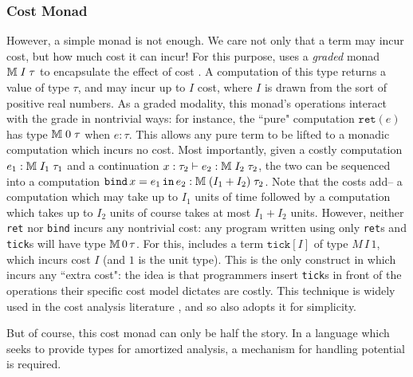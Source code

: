 \subsubsection{Cost Monad}
 However, a simple monad is not enough. We care not only that a term may incur cost, but how much cost it can incur! For this purpose, \lambdaamor uses a \textit{graded} monad $\mathbb{M} \; I \; \tau$ to encapsulate the effect of cost \cite{gaboardi-et-al:icfp16}. A computation of this type returns a value of type $\tau$, and may incur up to $I$ cost, where $I$ is drawn from the sort of positive real numbers. As a graded modality, this monad's operations interact with the grade in nontrivial ways: for instance, the ``pure" computation $\texttt{ret}(e)$ has type $\mathbb{M} \; 0 \; \tau$ when $e : \tau$. This allows any pure term to be lifted to a monadic computation which incurs no cost. Most importantly, given a costly computation $e_1 : \mathbb{M} \; I_1 \; \tau_1$ and a continuation $x : \tau_2 \vdash e_2 : \mathbb{M} \; I_2 \; \tau_2$, the two can be sequenced into a computation $\texttt{bind}\, x = e_1\, \texttt{in}\, e_2 : \mathbb{M} \; (I_1 + I_2) \; \tau_2$. Note that the costs add-- a computation which may take up to $I_1$ units of time followed by a computation which takes up to $I_2$ units of course takes at most $I_1 + I_2$ units. However, neither \texttt{ret} nor \texttt{bind} incurs any nontrivial cost: any program written using only \texttt{ret}s and \texttt{tick}s will have type $\mathbb{M} \, 0 \, \tau$. For this, \lambdaamor includes a term $\texttt{tick}[I]$ of type $M \, I \, 1$, which incurs cost $I$ (and $1$ is the unit type). This is the only construct in \lambdaamor which incurs any ``extra cost": the idea is that programmers insert \texttt{tick}s in front of the operations their specific cost model dictates are costly. This technique is widely used in the cost analysis literature \cite{danielsson:popl08}, and so \lambdaamor also adopts it for simplicity.
 
But of course, this cost monad can only be half the story. In a language which seeks to provide types for amortized analysis, a mechanism for handling potential is required.
 
